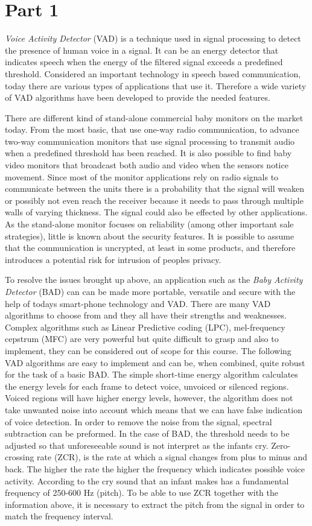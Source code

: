 \section{Part 1} \emph{Voice Activity Detector} (VAD) is a technique used in
signal processing to detect the presence of human voice in a signal. It can be
an energy detector that indicates speech when the energy of the filtered signal
exceeds a predefined threshold. Considered an important technology in speech
based communication, today there are various types of applications that use it.
Therefore a wide variety of VAD algorithms have been developed to provide the
needed features. 

There are different kind of stand-alone commercial baby monitors on the market
today.  From the most basic, that use one-way radio communication, to advance
two-way communication monitors that use signal processing to transmit audio
when a predefined threshold has been reached. It is also possible to find baby
video monitors that broadcast both audio and video when the sensors notice
movement. Since most of the monitor applications rely on radio signals to
communicate between the units there is a probability that the signal will
weaken or possibly not even reach the receiver because it needs to pass through
multiple walls of varying thickness. The signal could also be effected by other
applications.  As the stand-alone monitor focuses on reliability (among other
important sale strategies), little is known about the security
features. It is possible to assume that the communication is uncrypted, at
least in some products, and therefore introduces a potential risk for intrusion
of peoples privacy. 

To resolve the issues brought up above, an application such as the \emph{Baby
Activity Detector} (BAD) can can be made more portable, versatile and
secure with the help of todays smart-phone technology and VAD. There
are many VAD algorithms to choose from and they all have their
strengths and weaknesses. Complex algorithms such as Linear Predictive
coding (LPC), mel-frequency cepstrum (MFC) are very powerful but quite
difficult to grasp and also to implement, they can be considered out of
scope for this course. The following VAD algorithms are easy to
implement and can be, when combined, quite robust for the task of a
basic BAD. The simple short-time energy algorithm calculates the energy
levels for each frame to detect voice, unvoiced or silenced regions.
Voiced regions will have higher energy levels, however, the algorithm
does not take unwanted noise into account which means that we can have
false indication of voice detection. In order to remove the noise from
the signal, spectral subtraction can be preformed. In the case of BAD,
the threshold needs to be adjusted so that unforeseeable sound is not
interpret as the infants cry.  Zero-crossing rate (ZCR), is the rate at
which a signal changes from plus to minus and back.  The higher the
rate the higher the frequency which indicates possible voice activity.
According to \cite{infantDetec} the cry sound that an infant makes has
a fundamental frequency of 250-600 Hz (pitch). To be able to use ZCR
together with the information above, it is necessary to extract the
pitch from the signal in order to match the frequency interval. 


